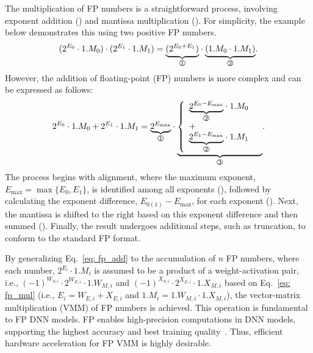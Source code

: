  The multiplication of FP numbers is a straightforward process, involving exponent addition () and mantissa multiplication (). 
For simplicity, the example below demonstrates this using two positive FP numbers.
\begin{equation}
             (2^{E_0}\cdot1.M_0) \cdot (2^{E_1}\cdot1.M_1) = \underset{\text{\circled{1}}}{\underbrace{(2^{E_0 +E_1})}} \cdot \underset{\text{\circled{2}}}{\underbrace{(1.M_0\cdot 1.M_1)}}. 
    \label{eq: fp_mul}
\end{equation}
    \vskip -3pt
 However, the addition of floating-point (FP) numbers is more complex and can be expressed as follows:
\begin{equation}
             2^{E_0}\cdot1.M_0+2^{E_1}\cdot1.M_1 = \underset{\text{\circled{1}}}{\underbrace{ 2^{{E_{\max}}}}} \cdot \underset{\text{\circled{3}}}{\underbrace{
\left\{ 
             \begin{array}{lr}
              \underset{\text{\circled{2}}}{\underbrace{2^{{E_{0}}-{E_{\max}}}}} \cdot 1.M_{0} &  \\
                +&  \\
              \underset{\text{\circled{2}}}{\underbrace{2^{{E_{1}}-{E_{\max}}}}} \cdot 1.M_{1}
             \end{array}
\right.}}.
    \label{eq: fp_add}
\end{equation}
The process begins with alignment, where the maximum exponent, $E_{\max}=\max\{E_0, E_1\}$,  is identified among all exponents (), followed by calculating the exponent difference, $E_{0(1)}-{E_{\max}}$, for each exponent ().
Next, the mantissa is shifted to the right based on this exponent difference and then summed ().
Finally, the result undergoes additional steps, such as truncation, to conform to the standard FP format.

  By generalizing Eq.~\eqref{eq: fp_add} to the accumulation of $n$ FP numbers, where each number, $2^{E_i}\cdot 1.M_{i}$ is assumed to be a product of a weight-activation pair, i.e., $(-1)^{W_{S,i}}\cdot2^{W_{E,i}}\cdot 1.W_{M,i}$ and $(-1)^{X_{S,i}}\cdot 2^{X_{E,i}}\cdot 1.X_{M,i}$ based on Eq.~\eqref{eq: fp_mul} (i.e., $E_i=W_{E,i}+X_{E,i}$ and $1.M_{i}=1.W_{M,i}\cdot1.X_{M,i}$), the vector-matrix multiplication (VMM) of FP numbers is achieved. 
This operation is fundamental to FP DNN models.
FP enables high-precision computations in DNN models, supporting the highest accuracy and best training quality~\cite{micikevicius2022fp8}.
Thus, efficient hardware acceleration for FP VMM is highly desirable.



